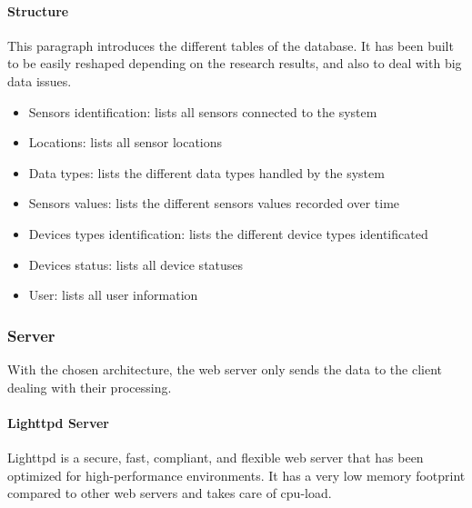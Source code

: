     
    \paragraph{Structure}
    
    This paragraph introduces the different tables of the database. It has been built to be easily reshaped depending on the research results, and also to deal with big data issues. %
    
    \begin{itemize} %
    \item Sensors identification: lists all sensors connected to the system
    \item Locations: lists all sensor locations
    \item Data types: lists the different data types handled by the system
    \item Sensors values: lists the different sensors values recorded over time
    \item Devices types identification: lists the different device types identificated
    \item Devices status: lists all device statuses
    \item User: lists all user information
    \end{itemize}
    
    
\subsubsection{Server}

    With the chosen architecture, the web server only sends the data to the client dealing with their processing.
    
    \paragraph{Lighttpd Server}
    Lighttpd is a secure, fast, compliant, and flexible web server that has been optimized for high-performance environments. It has a very low memory footprint compared to other web servers and takes care of cpu-load.







